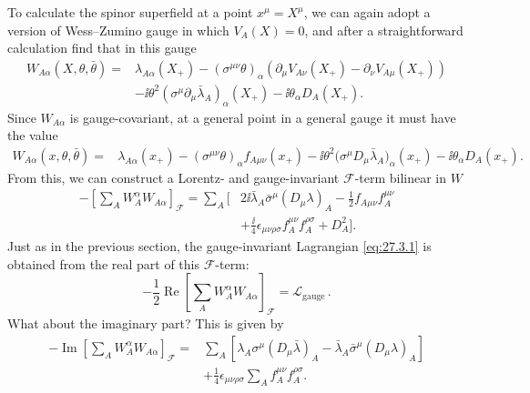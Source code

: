 To calculate the spinor superfield at a point \(x^\mu=X^\mu\), we can
again adopt a version of Wess--Zumino gauge in which \(V_A(X)=0\), and
after a straightforward calculation find that in this gauge
\[
  \begin{aligned}
  W_{A\alpha}(X,\theta,\bar\theta)={}&
  \lambda_{A\alpha}(X_+)
  -(\sigma^{\mu\nu}\theta)_\alpha
    \left(
      \partial_\mu V_{A\nu}(X_+)-\partial_\nu V_{A\mu}(X_+)
    \right)
  \\
  &-\ii\theta^2
    (\sigma^\mu\partial_\mu\bar\lambda_A)_\alpha(X_+)
  -\ii\theta_\alpha D_A(X_+).
  \end{aligned}
\]
Since \(W_{A\alpha}\) is gauge-covariant, at a general point in a general
gauge
it must have the value
\begin{equation}
  \begin{aligned}
  W_{A\alpha}(x,\theta,\bar\theta)={}&
  \lambda_{A\alpha}(x_+)
  -(\sigma^{\mu\nu}\theta)_\alpha f_{A\mu\nu}(x_+)
  -\ii\theta^2
    \bigl(\sigma^\mu D_\mu\bar\lambda_A\bigr)_\alpha(x_+)
  -\ii\theta_\alpha D_A(x_+).
  \end{aligned}
  \tag{27.3.15}\label{eq:27.3.15}
\end{equation}
From this, we can construct a Lorentz- and gauge-invariant
\(\mathcal{F}\)-term bilinear in \(W\)
\begin{equation}
  \begin{aligned}
  -\left[\sum_AW_A^\alpha W_{A\alpha}\right]_{\mathcal{F}}
  =\sum_A\biggl[
    &2\ii\bar\lambda_A\bar\sigma^\mu(D_\mu\lambda)_A
    -\frac12 f_{A\mu\nu}f_A^{\mu\nu}
  \\
    &+\frac{\ii}{4}\epsilon_{\mu\nu\rho\sigma}
      f_A^{\mu\nu}f_A^{\rho\sigma}
    +D_A^2
  \biggr].
  \end{aligned}
  \tag{27.3.16}\label{eq:27.3.16}
\end{equation}
Just as in the previous section, the gauge-invariant Lagrangian
\eqref{eq:27.3.1} is obtained from the real part of this
\(\mathcal{F}\)-term:
\begin{equation}
  -\frac12\operatorname{Re}\left[
    \sum_AW_A^\alpha W_{A\alpha}
  \right]_{\mathcal{F}}
  =\mathcal{L}_{\mathrm{gauge}}\,.
  \tag{27.3.17}\label{eq:27.3.17}
\end{equation}
What about the imaginary part? This is given by
\begin{equation}
  \begin{aligned}
  -\operatorname{Im}\left[
    \sum_AW_A^\alpha W_{A\alpha}
  \right]_{\mathcal{F}}
  ={}&
  \sum_A\left[
    \lambda_A\sigma^\mu(D_\mu\bar\lambda)_A
    -\bar\lambda_A\bar\sigma^\mu(D_\mu\lambda)_A
  \right]
  \\
  &+\frac14\epsilon_{\mu\nu\rho\sigma}
    \sum_A f_A^{\mu\nu}f_A^{\rho\sigma}.
  \end{aligned}
  \tag{27.3.18}\label{eq:27.3.18}
\end{equation}
